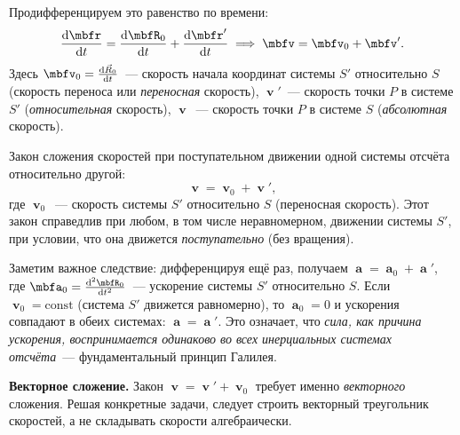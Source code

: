 \documentclass[../main.tex]{subfiles}
\begin{document}
Продифференцируем это равенство по времени:
\begin{equation*}
\dv{\mbfr}{t} = \dv{\mbfR_0}{t} + \dv{\mbfr'}{t} \implies \mbfv = \mbfv_0  + \mbfv'.
\end{equation*}
Здесь $\mbfv_0 = \dv{\vec{R}_0}{t}$~--- скорость начала координат системы $S'$ относительно $S$ (скорость переноса или \textit{переносная} скорость),
$\mbfv'$~--- скорость точки $P$ в системе $S'$
(\textit{относительная}  скорость),
$\mbfv$~--- скорость точки $P$ в системе $S$
(\textit{абсолютная}  скорость).

\begin{definition}
Закон сложения скоростей при поступательном движении одной системы отсчёта относительно другой:
\begin{equation*}
    \mbfv = \mbfv_0  + \mbfv',
\end{equation*}
где $\mbfv_0$~--- скорость системы $S'$ относительно $S$ (переносная скорость). Этот закон справедлив при любом, в том числе неравномерном, движении системы $S'$, при условии, что она движется \textit{поступательно} (без вращения).
\end{definition}

Заметим важное следствие: дифференцируя ещё раз, получаем
$\mbfa = \mbfa_0 + \mbfa'$, где $\mbfa_0 = \dv[2]{\mbfR_0}{t}$~---
ускорение системы $S'$ относительно $S$.
Если $\mbfv_0 = \mathrm{const}$ (система $S'$ движется равномерно),
то $\mbfa_0 = 0$ и ускорения совпадают в обеих системах:
$\mbfa = \mbfa'$.
Это означает, что \textit{сила, как причина ускорения, воспринимается
одинаково во всех инерциальных системах отсчёта}~---
фундаментальный принцип Галилея.

\noindent\textbf{Векторное сложение.}
Закон $\mbfv = \mbfv' + \mbfv_0$ требует именно
\textit{векторного} сложения. Решая конкретные задачи,
следует строить векторный треугольник скоростей, а не
складывать скорости алгебраически.
\end{document}
